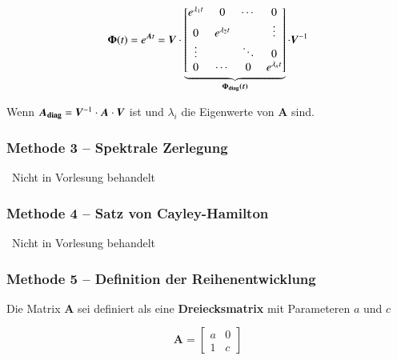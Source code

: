 \begin{minipage}[c]{0.6\columnwidth}
    $$ \bm{\Phi}(t) = e^{\bm{A} t} = \bm{V} \cdot \underbrace{ 
    \begin{bmatrix*} 
        e^{\lambda_1 t} & 0                 & \cdots        & 0      \\
        0               & e^{\lambda_2 t}   &               & \vdots \\
        \vdots          &                   & \ddots        & 0      \\
        0               & \cdots            & 0             & e^{\lambda_n t}
\end{bmatrix*}}_{\bm{\Phi_{\rm diag}(t)}} \cdot \bm{V}^{-1} $$
\end{minipage}
\hfill
\begin{minipage}[c]{0.36\columnwidth}
    Wenn $\bm{A_{\rm diag}} = \bm{V}^{-1} \cdot \bm{A} \cdot \bm{V}$ ist und $\lambda_i$ die Eigenwerte von $\bm{A}$ sind.
\end{minipage}


\subsubsection{Methode 3 -- Spektrale Zerlegung}

\textrightarrow\ Nicht in Vorlesung behandelt


\subsubsection{Methode 4 -- Satz von Cayley-Hamilton}
\textrightarrow\ Nicht in Vorlesung behandelt


\subsubsection{Methode 5 -- Definition der Reihenentwicklung}


\begin{minipage}[c]{0.6\columnwidth}
    Die Matrix $\bm{A}$ sei definiert als eine \textbf{Dreiecksmatrix} mit Parameteren $a$ und $c$
\end{minipage}
\hfill
\begin{minipage}[c]{0.38\columnwidth}
    $$ \bm{A} = \begin{bmatrix*} a & 0 \\ 1 & c \end{bmatrix*} $$
\end{minipage}


